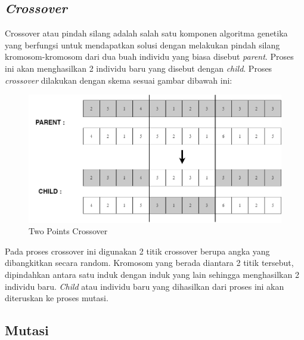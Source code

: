 \subsection{\emph{Crossover}}
  
Crossover atau pindah silang adalah salah satu komponen algoritma genetika yang \linebreak berfungsi untuk mendapatkan solusi dengan melakukan pindah silang kromosom-kromosom dari dua buah individu yang biasa disebut \emph{parent}. 
Proses ini akan menghasilkan 2 individu baru yang disebut dengan \emph{child}. 
Proses \emph{crossover} dilakukan dengan skema sesuai gambar dibawah ini:


\begin{figure} [ht] \centering
  \includegraphics[scale=0.4]{gambar/cross.png}
  \caption{Two Points Crossover}
  \label{fig:cross}
\end{figure}

Pada proses crossover ini digunakan 2 titik crossover berupa angka yang dibangkitkan secara random.
Kromosom yang berada diantara 2 titik tersebut, dipindahkan antara satu induk dengan induk yang lain sehingga menghasilkan 2 individu baru.
\emph{Child} atau individu baru yang dihasilkan dari proses ini akan diteruskan ke proses mutasi.

\subsection{Mutasi}
  
